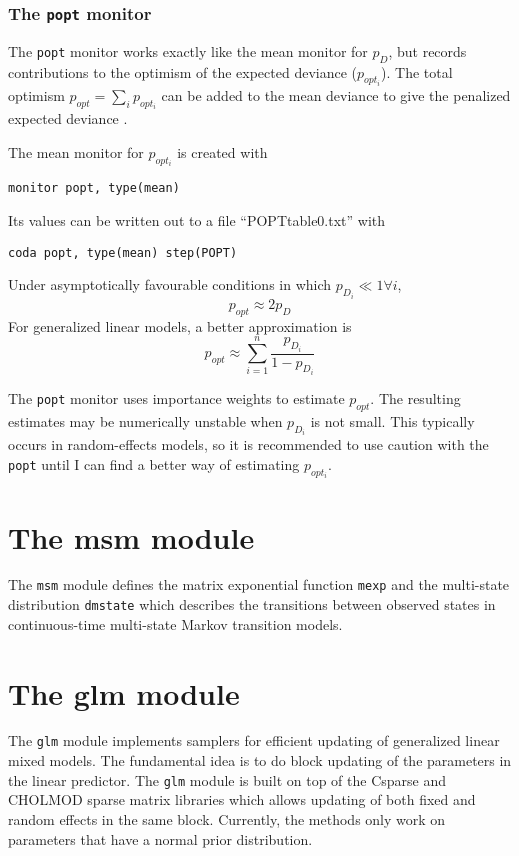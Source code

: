 \documentclass[11pt, a4paper, titlepage]{report}
\begin{document}
\subsection{The \texttt{popt} monitor}

The \verb+popt+ monitor works exactly like the mean monitor for $p_D$,
but records contributions to the optimism of the expected deviance
($p_{opt_i}$). The total optimism $p_{opt} = \sum_i p_{opt_i}$  can be
added to the mean deviance to give the penalized expected deviance
\cite{plummer:2008}.

The mean monitor for $p_{opt_i}$ is created with
\begin{verbatim}
monitor popt, type(mean)
\end{verbatim}
Its values can be written out to a file ``POPTtable0.txt'' with
\begin{verbatim}
coda popt, type(mean) step(POPT)
\end{verbatim}
Under asymptotically favourable conditions in which $p_{D_i} \ll 1
\forall i$,
\[
p_{opt} \approx 2 p_D
\]
For generalized linear models, a better approximation is
\[
p_{opt} \approx \sum_{i=1}^n \frac {p_{D_i}}{1 - p_{D_i}}
\]

The \verb+popt+ monitor uses importance weights to estimate
$p_{opt}$. The resulting estimates may be numerically unstable when
$p_{D_i}$ is not small.  This typically occurs in random-effects
models, so it is recommended to use caution with the \verb+popt+
until I can find a better way of estimating $p_{opt_i}$.

\chapter{The msm module}

The \verb+msm+ module defines the matrix exponential function
\verb+mexp+ and the multi-state distribution \verb+dmstate+ which
describes the transitions between observed states in continuous-time
multi-state Markov transition models. 

\chapter{The glm module}

The \verb+glm+ module implements samplers for efficient updating of
generalized linear mixed models.  The fundamental idea is to do block
updating of the parameters in the linear predictor.  The \verb+glm+
module is built on top of the \textsf{Csparse} and \textsf{CHOLMOD}
sparse matrix libraries
\cite{Davis2006, Davis1999} which allows updating of both fixed and random
effects in the same block. Currently, the methods only work on
parameters that have a normal prior distribution.
\end{document}
